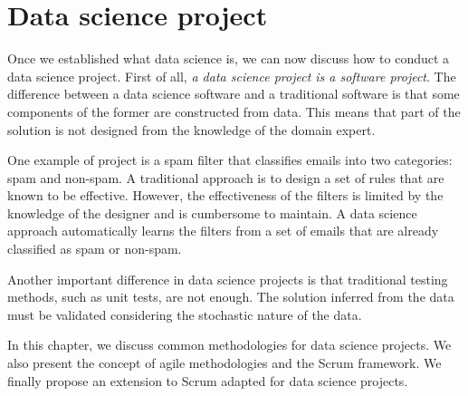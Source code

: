 \chapter{Data science project}
\label{chap:project}



Once we established what data science is, we can now discuss how to conduct a data science
project.
First of all, \emph{a data science project is a software project}.  The difference between a data
science software and a traditional software is that some components of the former are
constructed from data.  This means that part of the solution is not designed from the
knowledge of the domain expert.

One example of project is a spam filter that
classifies emails into two categories: spam and non-spam.  A traditional approach is
to design a set of rules that are known to be effective.  However, the effectiveness of
the filters is limited by the knowledge of the designer and is cumbersome to maintain.  A
data science approach automatically learns the filters from a set of
emails that are already classified as spam or non-spam.

Another important difference in data science projects is that traditional testing methods,
such as unit tests, are not enough.  The solution inferred from the data must be validated
considering the stochastic nature of the data.

In this chapter, we discuss common methodologies for data science projects.  We also
present the concept of agile methodologies and the Scrum framework.  We finally propose an
extension to Scrum adapted for data science projects.

